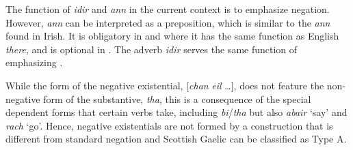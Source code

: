 ﻿\documentclass[output=paper]{langsci/langscibook}
\begin{document}
\begin{unindented}
The function of \textit{idir} and \textit{ann} in the current context is to emphasize negation. However, \textit{ann} can be interpreted as a preposition, which is similar to the \textit{ann} found in Irish. It is obligatory in  and  where it has the same function as English \textit{there}, and is optional in . The adverb \textit{idir} serves the same function of emphasizing .  

While the form of the negative existential, [\textit{chan} \textit{eil} …],
does not feature the non-negative form of the substantive, \textit{tha},
this is a consequence of the special dependent forms that certain verbs
take, including \textit{bi}/\textit{tha} but also \textit{abair} `say' and \textit{rach} ‘go'. Hence, negative existentials are not formed by a construction that is different from standard negation and Scottish Gaelic can be classified as Type A. 

\end{unindented}
{\sloppy\printbibliography[heading=subbibliography,notkeyword=source]}
\end{document}
